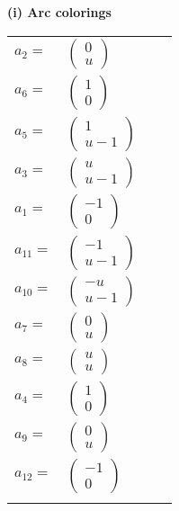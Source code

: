 \documentclass[1p]{elsarticle_modified}
\theoremstyle{definition}
\begin{document}
\flushleft \textbf{(i) Arc colorings}\\
\begin{tabular}{m{7pt} m{180pt} m{7pt} m{180pt} }
\flushright $a_{2}=$&$\begin{pmatrix}0\\u\end{pmatrix}$ \\
\flushright $a_{6}=$&$\begin{pmatrix}1\\0\end{pmatrix}$ \\
\flushright $a_{5}=$&$\begin{pmatrix}1\\u-1\end{pmatrix}$ \\
\flushright $a_{3}=$&$\begin{pmatrix}u\\u-1\end{pmatrix}$ \\
\flushright $a_{1}=$&$\begin{pmatrix}-1\\0\end{pmatrix}$ \\
\flushright $a_{11}=$&$\begin{pmatrix}-1\\u-1\end{pmatrix}$ \\
\flushright $a_{10}=$&$\begin{pmatrix}- u\\u-1\end{pmatrix}$ \\
\flushright $a_{7}=$&$\begin{pmatrix}0\\u\end{pmatrix}$ \\
\flushright $a_{8}=$&$\begin{pmatrix}u\\u\end{pmatrix}$ \\
\flushright $a_{4}=$&$\begin{pmatrix}1\\0\end{pmatrix}$ \\
\flushright $a_{9}=$&$\begin{pmatrix}0\\u\end{pmatrix}$ \\
\flushright $a_{12}=$&$\begin{pmatrix}-1\\0\end{pmatrix}$\\&\end{tabular}
\end{document}
